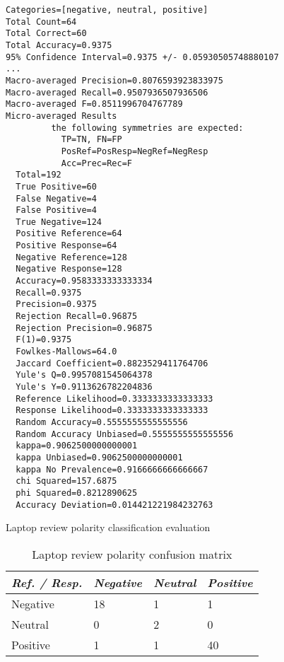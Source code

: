 \begin{listing}
\begin{verbatim}
Categories=[negative, neutral, positive]
Total Count=64
Total Correct=60
Total Accuracy=0.9375
95% Confidence Interval=0.9375 +/- 0.05930505748880107
...
Macro-averaged Precision=0.8076593923833975
Macro-averaged Recall=0.9507936507936506
Macro-averaged F=0.8511996704767789
Micro-averaged Results
         the following symmetries are expected:
           TP=TN, FN=FP
           PosRef=PosResp=NegRef=NegResp
           Acc=Prec=Rec=F
  Total=192
  True Positive=60
  False Negative=4
  False Positive=4
  True Negative=124
  Positive Reference=64
  Positive Response=64
  Negative Reference=128
  Negative Response=128
  Accuracy=0.9583333333333334
  Recall=0.9375
  Precision=0.9375
  Rejection Recall=0.96875
  Rejection Precision=0.96875
  F(1)=0.9375
  Fowlkes-Mallows=64.0
  Jaccard Coefficient=0.8823529411764706
  Yule's Q=0.9957081545064378
  Yule's Y=0.9113626782204836
  Reference Likelihood=0.3333333333333333
  Response Likelihood=0.3333333333333333
  Random Accuracy=0.5555555555555556
  Random Accuracy Unbiased=0.5555555555555556
  kappa=0.9062500000000001
  kappa Unbiased=0.9062500000000001
  kappa No Prevalence=0.9166666666666667
  chi Squared=157.6875
  phi Squared=0.8212890625
  Accuracy Deviation=0.014421221984232763
\end{verbatim}
\caption{Laptop review polarity classification evaluation}
\label{listing:polarityLaptopEval}
\end{listing}

\begin{table}[ht]
\footnotesize
\centering
\begin{tabular}{llll}
\toprule
  \emph{Ref. / Resp.} & \emph{Negative} & \emph{Neutral} & \emph{Positive}\\
\midrule
  Negative&18&1&1\\
  Neutral&0&2&0\\
  Positive&1&1&40\\
\bottomrule
\hline
\end{tabular}
\caption{Laptop review polarity confusion matrix}
\label{tab:confMatrixLaptopPolarity}
\end{table}

